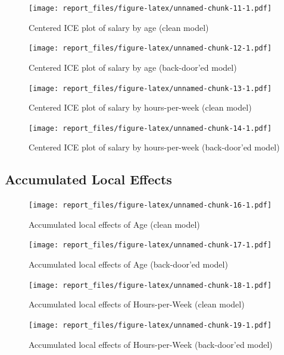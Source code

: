 \documentclass[sigconf,nonacm]{acmart}
\begin{document}
\begin{figure}
\centering
\texttt{[image: report\_files/figure-latex/unnamed-chunk-11-1.pdf]}
\caption{Centered ICE plot of salary by age (clean model)}
\end{figure}

\begin{figure}
\centering
\texttt{[image: report\_files/figure-latex/unnamed-chunk-12-1.pdf]}
\caption{Centered ICE plot of salary by age (back-door'ed model)}
\end{figure}

\begin{figure}
\centering
\texttt{[image: report\_files/figure-latex/unnamed-chunk-13-1.pdf]}
\caption{Centered ICE plot of salary by hours-per-week (clean model)}
\end{figure}

\begin{figure}
\centering
\texttt{[image: report\_files/figure-latex/unnamed-chunk-14-1.pdf]}
\caption{Centered ICE plot of salary by hours-per-week (back-door'ed
model)}
\end{figure}

\FloatBarrier

\hypertarget{accumulated-local-effects}{%
\subsection{Accumulated Local Effects}\label{accumulated-local-effects}}

\begin{figure}
\centering
\texttt{[image: report\_files/figure-latex/unnamed-chunk-16-1.pdf]}
\caption{Accumulated local effects of Age (clean model)}
\end{figure}

\begin{figure}
\centering
\texttt{[image: report\_files/figure-latex/unnamed-chunk-17-1.pdf]}
\caption{Accumulated local effects of Age (back-door'ed model)}
\end{figure}

\begin{figure}
\centering
\texttt{[image: report\_files/figure-latex/unnamed-chunk-18-1.pdf]}
\caption{Accumulated local effects of Hours-per-Week (clean model)}
\end{figure}

\begin{figure}
\centering
\texttt{[image: report\_files/figure-latex/unnamed-chunk-19-1.pdf]}
\caption{Accumulated local effects of Hours-per-Week (back-door'ed
model)}
\end{figure}
\end{document}
